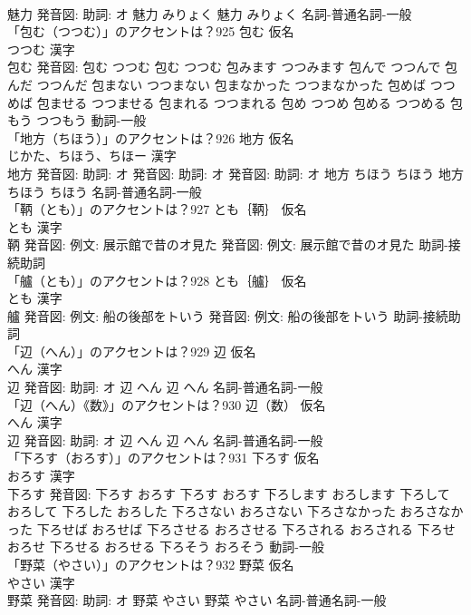 \documentclass[8pt]{extreport}
\begin{document}
\begin{CJK}{UTF8}{min}
\\	魅力 発音図: 助詞: オ	魅力 みりょく		魅力 みりょく				名詞-普通名詞-一般 
\\	「包む（つつむ）」のアクセントは？925	包む 仮名　
\\	つつむ 漢字　
\\	包む 発音図:	包む つつむ		包む つつむ 包みます つつみます 包んで つつんで 包んだ つつんだ 包まない つつまない 包まなかった つつまなかった 包めば つつめば 包ませる つつませる 包まれる つつまれる 包め つつめ 包める つつめる 包もう つつもう				動詞-一般 
\\	「地方（ちほう）」のアクセントは？926	地方 仮名　
\\	じかた、ちほう、ちほー 漢字　
\\	地方 発音図: 助詞: オ 発音図: 助詞: オ 発音図: 助詞: オ	地方 ちほう ちほう		地方 ちほう ちほう				名詞-普通名詞-一般 
\\	「鞆（とも）」のアクセントは？927	とも｛鞆｝ 仮名　
\\	とも 漢字　
\\	鞆 発音図: 例文: 展示館で昔のオ見た 発音図: 例文: 展示館で昔のオ見た							助詞-接続助詞 
\\	「艫（とも）」のアクセントは？928	とも｛艫｝ 仮名　
\\	とも 漢字　
\\	艫 発音図: 例文: 船の後部をトいう 発音図: 例文: 船の後部をトいう							助詞-接続助詞 
\\	「辺（へん）」のアクセントは？929	辺 仮名　
\\	へん 漢字　
\\	辺 発音図: 助詞: オ	辺 へん		辺 へん				名詞-普通名詞-一般 
\\	「辺（へん）《数》」のアクセントは？930	辺（数） 仮名　
\\	へん 漢字　
\\	辺 発音図: 助詞: オ	辺 へん		辺 へん				名詞-普通名詞-一般 
\\	「下ろす（おろす）」のアクセントは？931	下ろす 仮名　
\\	おろす 漢字　
\\	下ろす 発音図:	下ろす おろす		下ろす おろす 下ろします おろします 下ろして おろして 下ろした おろした 下ろさない おろさない 下ろさなかった おろさなかった 下ろせば おろせば 下ろさせる おろさせる 下ろされる おろされる 下ろせ おろせ 下ろせる おろせる 下ろそう おろそう				動詞-一般 
\\	「野菜（やさい）」のアクセントは？932	野菜 仮名　
\\	やさい 漢字　
\\	野菜 発音図: 助詞: オ	野菜 やさい		野菜 やさい				名詞-普通名詞-一般 

\end{CJK}
\end{document}
